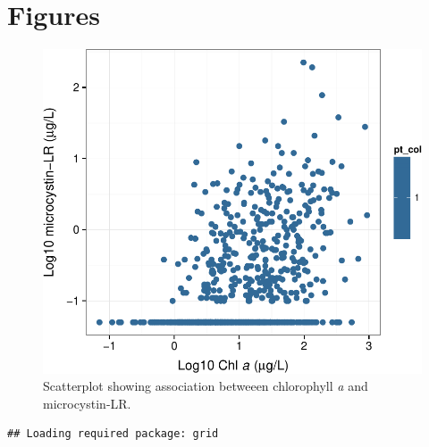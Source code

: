 \documentclass[11pt,]{article}
\begin{document}
\newpage

\section{Figures}\label{figures}

\begin{figure}[htbp]
\centering
\includegraphics{manuscript_files/figure-latex/chla_micro_scatter-1.pdf}
\caption{Scatterplot showing association betweeen chlorophyll \textit{a}
and microcystin-LR. \label{fig:chla_micro_scatter}}
\end{figure}

\newpage

\begin{verbatim}
## Loading required package: grid
\end{verbatim}
\end{document}
